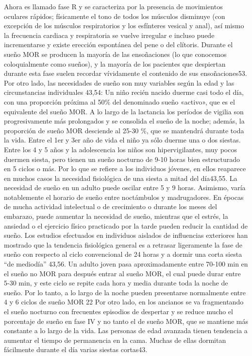 Ahora es llamado fase R y se caracteriza por la presencia de movimientos oculares rápidos; físicamente el tono de todos los músculos disminuye (con excepción de los músculos respiratorios y los esfínteres vesical y anal), así mismo la frecuencia cardiaca y respiratoria se vuelve irregular e incluso puede incrementarse y existe erección espontánea del pene o del clítoris. Durante el sueño MOR se producen la mayoría de las ensoñaciones (lo que conocemos coloquialmente como sueños), y la mayoría de los pacientes que despiertan durante esta fase suelen recordar vívidamente el contenido de sus ensoñaciones53.
Por otro lado, las necesidades de sueño son muy variables según la edad y las circunstancias individuales 43,54:
Un niño recién nacido duerme casi todo el día, con una proporción próxima al 50\% del denominado sueño «activo», que es el equivalente del sueño MOR. A lo largo de la lactancia los períodos de vigilia son progresivamente más prolongados y se consolida el sueño de la noche; además, la proporción de sueño MOR desciende al 25-30 \%, que se mantendrá durante toda la vida. Entre el 1er y 3er año de vida el niño ya sólo duerme una o dos siestas. Entre los 4 y 5 años y la adolescencia los niños son hipervigilantes, muy pocos duermen siesta, pero tienen un sueño nocturno de 9-10 horas bien estructurado en 5 ciclos o más. Por lo que se refiere a los individuos jóvenes, en ellos reaparece en muchos casos la necesidad fisiológica de una siesta a mitad del día43,55.
La necesidad de sueño en un adulto puede oscilar entre 5 y 9 horas. Asimismo, varía notablemente el horario de sueño entre noctámbulos y madrugadores. En épocas de mucha actividad intelectual o de crecimiento o durante los meses del embarazo, puede aumentar la necesidad de sueño, mientras que el estrés, la ansiedad o el ejercicio físico practicado por la tarde pueden reducir la cantidad de sueño. Los estudios efectuados en individuos aislados de influencias exteriores han mostrado que la tendencia fisiológica general es a retrasar ligeramente la fase de sueño con respecto al ciclo convencional de 24 horas y a dormir una corta siesta “de mediodía” 43,56. Un adulto joven pasa aproximadamente entre 70-100 min en el sueño no MOR para después entrar al sueño MOR, el cual puede durar entre 5-30 min, y este ciclo se repite cada hora y media durante toda la noche de sueño. Por lo tanto, a lo largo de la noche pueden presentarse normalmente entre 4 y 6 ciclos de sueño MOR 22
Por otro lado, en los ancianos se va fragmentando el sueño nocturno con frecuentes episodios de despertar y se reduce mucho el porcentaje de sueño en fase IV y no tanto el de sueño MOR, que se mantiene más constante a lo largo de la vida. Las personas de edad avanzada tienen tendencia a aumentar el tiempo de permanencia en la cama. Muchas de ellas dormitan fácilmente durante el día varias siestas cortas43.

